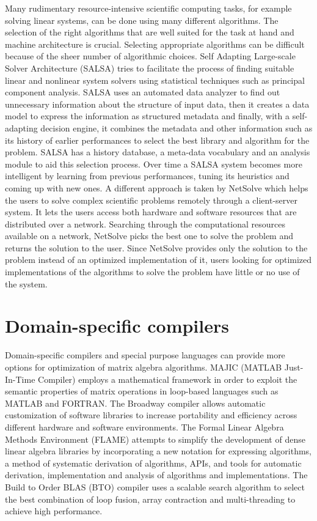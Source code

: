 Many rudimentary resource-intensive scientific computing tasks, for example solving linear systems, can be done using many different algorithms. The selection of the right algorithms that are well suited for the task at hand and machine architecture is crucial. Selecting appropriate algorithms can be difficult because of the sheer number of algorithmic choices. Self Adapting Large-scale Solver Architecture (SALSA) \cite{fuentes,salsa} tries to facilitate the process of finding suitable linear and nonlinear system solvers using statistical techniques such as principal component analysis. SALSA uses an automated data analyzer to find out unnecessary information about the structure of input data, then it creates a data model to express the information as structured metadata and finally, with a self-adapting decision engine, it combines the metadata and other information such as its history of earlier performances to select the best library and algorithm for the problem. SALSA has a history database, a meta-data vocabulary and an analysis module to aid this selection process. Over time a SALSA system becomes more intelligent by learning from previous performances, tuning its heuristics and coming up with new ones. A different approach is taken by NetSolve \cite{netsolve} which helps the users to solve complex scientific problems remotely through a client-server system. It lets the users access both hardware and software resources that are distributed over a network. Searching through the computational resources available on a network, NetSolve picks the best one to solve the problem and returns the solution to the user. Since NetSolve provides only the solution to the problem instead of an optimized implementation of it, users looking for optimized implementations of the algorithms to solve the problem have little or no use of the system.

\section{Domain-specific compilers}
Domain-specific compilers and special purpose languages can provide more options for optimization of matrix algebra algorithms. MAJIC (MATLAB Just-In-Time Compiler) \cite{menon} employs a mathematical framework in order to exploit the semantic properties of matrix operations in loop-based languages such as MATLAB and FORTRAN. The Broadway compiler \cite{guyer} allows automatic customization of software libraries to increase portability and efficiency across different hardware and software environments. The Formal Linear Algebra Methods Environment (FLAME) \cite{flame} attempts to simplify the development of dense linear algebra libraries by incorporating a new notation for expressing algorithms, a method of systematic derivation of algorithms, APIs, and tools for automatic derivation, implementation and analysis of algorithms and implementations. The Build to Order BLAS (BTO) \cite{bto} compiler uses a scalable search algorithm to select the best combination of loop fusion, array contraction and multi-threading to achieve high performance.

